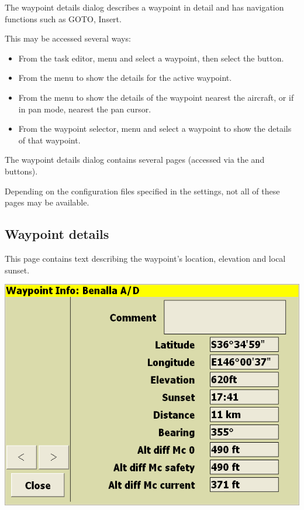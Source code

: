 \documentclass[a4paper,12pt]{refrep}
\begin{document}
The waypoint details dialog describes a waypoint in detail and has
navigation functions such as GOTO, Insert.

This may be accessed several ways:
\begin{itemize}
\item
From the task editor, menu \blink{} and select
a waypoint, then select the  button.

\item 
From the menu \blink{} to show the
details for the active waypoint.

\item
From the menu \blink{} to show the
details of the waypoint nearest the aircraft, or if in pan mode,
nearest the pan cursor.

\item
From the waypoint selector, menu \blink{} and select a waypoint to show the details of that waypoint.
\end{itemize}

The waypoint details dialog contains several pages (accessed via the
\button{$>$} and \button{$<$} buttons).

Depending on the configuration files specified in the settings, not
all of these pages may be available.

\subsection*{Waypoint details}
This page contains text describing the waypoint's location, elevation
and local sunset.  
\begin{center}
\includegraphics[angle=0,width=\linewidth,keepaspectratio='true']{figures/dialog-waypointdetails0.png}
\end{center}
\end{document}
